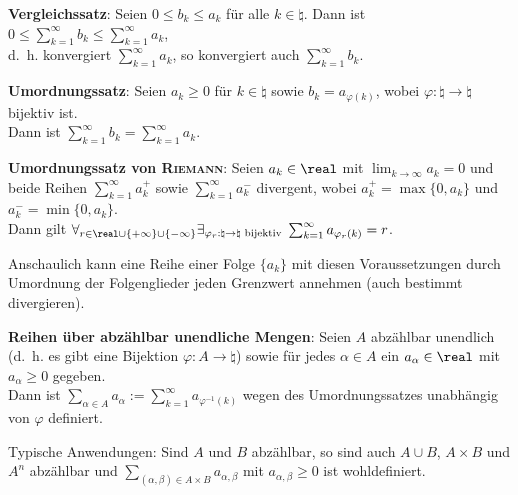 \textbf{Vergleichssatz}:
Seien $0 \le b_k \le a_k$ für alle $k \in \natural$.
Dann ist $0 \le \sum_{k=1}^\infty b_k \le \sum_{k=1}^\infty a_k$, \\
d.~h. konvergiert $\sum_{k=1}^\infty a_k$, so konvergiert auch
$\sum_{k=1}^\infty b_k$.

\textbf{Umordnungssatz}:
Seien $a_k \ge 0$ für $k \in \natural$ sowie $b_k = a_{\varphi(k)}$, wobei
$\varphi: \natural \rightarrow \natural$ bijektiv ist. \\
Dann ist $\sum_{k=1}^\infty b_k = \sum_{k=1}^\infty a_k$.

\textbf{Umordnungssatz von \textsc{Riemann}}:
Seien $a_k \in \real$ mit $\lim_{k \to \infty} a_k = 0$ und
beide Reihen $\sum_{k=1}^\infty a_k^+$ sowie $\sum_{k=1}^\infty a_k^-$
divergent, wobei
$a_k^+ = \max\{0, a_k\}$ und $a_k^- = \min\{0, a_k\}$. \\
Dann gilt
$\forall_{r \in \real \cup \{+\infty\} \cup \{-\infty\}}
\exists_{\varphi_r: \natural \rightarrow \natural \text{ bijektiv}}\;
\sum_{k=1}^\infty a_{\varphi_r(k)} = r$.

Anschaulich kann eine Reihe einer Folge $\{a_k\}$ mit diesen Voraussetzungen
durch Umordnung der Folgenglieder jeden Grenzwert annehmen
(auch bestimmt divergieren).

\linie

\textbf{Reihen über abzählbar unendliche Mengen}:
Seien $A$ abzählbar unendlich (d.~h. es gibt eine Bijektion
$\varphi: A \rightarrow \natural$) sowie für jedes $\alpha \in A$ ein
$a_\alpha \in \real$ mit $a_\alpha \ge 0$ gegeben. \\
Dann ist $\sum_{\alpha \in A} a_\alpha :=
\sum_{k=1}^\infty a_{\varphi^{-1}(k)}$ wegen des Umordnungssatzes
unabhängig von $\varphi$ definiert.

Typische Anwendungen: Sind $A$ und $B$ abzählbar, so sind auch
$A \cup B$, $A \times B$ und $A^n$ abzählbar und
$\sum_{(\alpha,\beta) \in A \times B} a_{\alpha,\beta}$ mit
$a_{\alpha,\beta} \ge 0$ ist wohldefiniert.

